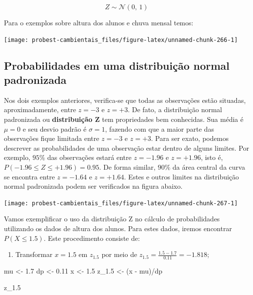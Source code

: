 \documentclass[
]{book}
\newenvironment{Shaded}{\begin{snugshade}}{\end{snugshade}}
\newcommand{\FloatTok}[1]{\textcolor[rgb]{0.00,0.00,0.81}{#1}}
\newcommand{\NormalTok}[1]{#1}
\newcommand{\OtherTok}[1]{\textcolor[rgb]{0.56,0.35,0.01}{#1}}
\newcommand{\SpecialCharTok}[1]{\textcolor[rgb]{0.00,0.00,0.00}{#1}}
\providecommand{\tightlist}{%
  \setlength{\itemsep}{0pt}\setlength{\parskip}{0pt}}
\begin{document}
\[Z \sim \mathcal{N}(0,\,1)\]

Para o exemplos sobre altura dos alunos e chuva mensal temos:

\begin{center}\texttt{[image: probest-cambientais\_files/figure-latex/unnamed-chunk-266-1]} \end{center}

\hypertarget{probabilidades-em-uma-distribuiuxe7uxe3o-normal-padronizada}{%
\subsection{Probabilidades em uma distribuição normal padronizada}\label{probabilidades-em-uma-distribuiuxe7uxe3o-normal-padronizada}}

Nos dois exemplos anteriores, verifica-se que todas as observações estão situadas, aproximadamente, entre \(z = -3\) e \(z = +3\). De fato, a distribuição normal padronizada ou \textbf{distribuição Z} tem propriedades bem conhecidas. Sua média é \(\mu = 0\) e seu desvio padrão é \(\sigma = 1\), fazendo com que a maior parte das observações fique limitada entre \(z = -3\) e \(z = +3\). Para ser exato, podemos descrever as probabilidades de uma observação estar dentro de alguns limites. Por exemplo, \(95\%\) das observações estará entre \(z = -1.96\) e \(z = +1.96\), isto é, \(P(-1.96 \le Z \le +1.96) = 0.95\). De forma similar, \(90\%\) da área central da curva se encontra entre \(z = -1.64\) e \(z = +1.64\). Estes e outros limites na distribuição normal padronizada podem ser verificados na figura abaixo.

\begin{center}\texttt{[image: probest-cambientais\_files/figure-latex/unnamed-chunk-267-1]} \end{center}

Vamos exemplificar o uso da distribuição Z no cálculo de probabilidades utilizando os dados de altura dos alunos. Para estes dados, iremos encontrar \(P(X \le 1.5)\). Este procedimento consiste de:

\begin{enumerate}
\def\labelenumi{\arabic{enumi}.}
\tightlist
\item
  Transformar \(x = 1.5\) em \(z_{1.5}\) por meio de \(z_{1.5} = \frac{1.5 - 1.7}{0.11} = -1.818\);
\end{enumerate}

\begin{Shaded}
\begin{Highlighting}[]
\NormalTok{mu }\OtherTok{\textless{}{-}} \FloatTok{1.7}
\NormalTok{dp }\OtherTok{\textless{}{-}} \FloatTok{0.11}
\NormalTok{x }\OtherTok{\textless{}{-}} \FloatTok{1.5}
\NormalTok{z\_1}\FloatTok{.5} \OtherTok{\textless{}{-}}\NormalTok{ (x }\SpecialCharTok{{-}}\NormalTok{ mu)}\SpecialCharTok{/}\NormalTok{dp}

\NormalTok{z\_1}\FloatTok{.5}
\end{Highlighting}
\end{Shaded}
\end{document}
